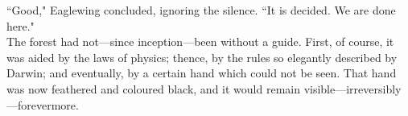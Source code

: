 ``Good," Eaglewing concluded, ignoring the silence.
``It is decided.
We are done here."\\

The forest had not---since inception---been without a guide.
First, of course, it was aided by the laws of physics; thence, by the rules so elegantly described by Darwin; and eventually, by a certain hand which could not be seen.
That hand was now feathered and coloured black, and it would remain visible---irreversibly---forevermore.